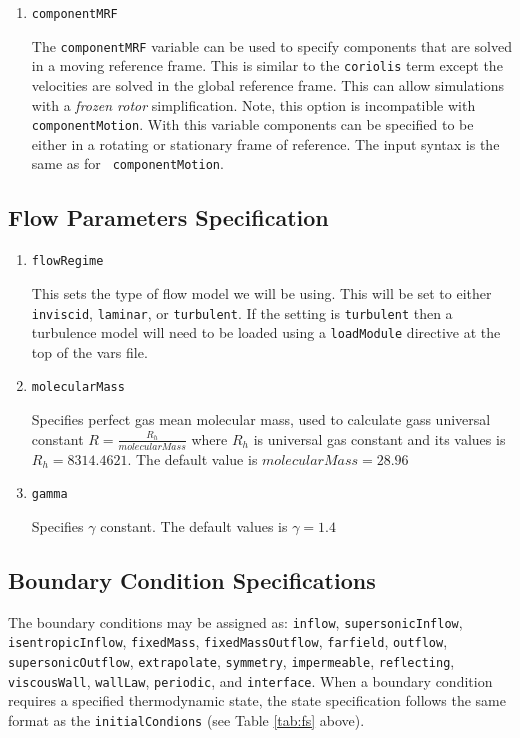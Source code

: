 \documentclass{article}
\begin{document}
\begin{enumerate}
\item {\tt componentMRF }

  The {\tt componentMRF} variable can be used to specify components
  that are solved in a moving reference frame.  This is similar to the
  {\tt coriolis} term except the velocities are solved in the global
  reference frame.  This can allow simulations with a {\it frozen
    rotor} simplification.  Note, this option is incompatible with
  {\tt componentMotion}.  With this variable components can be
  specified to be either in a rotating or stationary frame of
  reference.  The input syntax is the same as for {\tt
    componentMotion}.

\end{enumerate}

\subsection{Flow Parameters Specification}
\begin{enumerate}
\item {\tt flowRegime }

This sets the type of flow model we will be using.  This will be set
to either {\tt inviscid}, {\tt laminar}, or {\tt turbulent}.  If the
setting is {\tt turbulent} then a turbulence model will need to be
loaded using a {\tt loadModule} directive at the top of the vars file.  

\item {\tt molecularMass}

  Specifies perfect gas mean molecular mass, used to calculate gass universal constant 
  $R = \frac{R_h}{molecularMass}$ where $R_h$ is universal gas constant and its 
  values is $R_h=8314.4621$. The default value is $molecularMass = 28.96$


\item {\tt gamma}
  
  Specifies $\gamma$ constant. The default values is $\gamma=1.4$



\end{enumerate}

\subsection{Boundary Condition Specifications}


The boundary conditions may be assigned as:
  {\tt inflow}, {\tt supersonicInflow},
  {\tt isentropicInflow}, {\tt fixedMass}, {\tt fixedMassOutflow},
  {\tt farfield}, {\tt outflow}, {\tt supersonicOutflow},
  {\tt extrapolate}, {\tt symmetry}, {\tt impermeable},
  {\tt reflecting}, {\tt viscousWall}, {\tt wallLaw}, {\tt periodic},
  and {\tt interface}.  When a boundary condition requires a specified thermodynamic
  state, the state specification follows the same format as the {\tt initialCondions}
  (see Table \ref{tab:fs} above).\\
  
\end{document}
